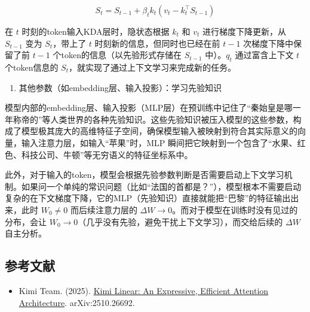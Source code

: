 \[
S_t=S_{t-1}+\beta_tk_t\left(v_t-k_t^\top S_{t-1}\right)
\]

在 \(t\) 时刻的token输入KDA层时，隐状态根据 \(k_t\) 和 \(v_t\) 进行梯度下降更新，从 \(S_{t-1}\) 变为 \(S_t\)，带上了 \(t\) 时刻新的信息，但同时也已经在前 \(t-1\) 次梯度下降中保留了前 \(t-1\) 个token的信息（以先验形式存储在 \(S_{t-1}\) 中）。\(q_t\) 通过富含上下文 \(t\) 个token信息的 \(S_t\)，就实现了通过上下文学习来完成新的任务。

\begin{enumerate}
\def\labelenumi{\arabic{enumi}.}
\setcounter{enumi}{2}
\tightlist
\item
  其他参数（如embedding层、输入投影）：学习先验知识
\end{enumerate}

模型内部的embedding层、输入投影（MLP层）在预训练中记住了``秦始皇是哪一年称帝的''等人类世界的各种先验知识。这些先验知识被压入模型的这些参数，构成了模型极其庞大的高维特征子空间，确保模型输入被映射到符合其实际意义的向量，输入注意力层，如输入``苹果''时，MLP 瞬间把它映射到一个包含了``水果、红色、科技公司、牛顿''等无穷语义的特征坐标系中。

此外，对于输入的token，模型会根据先验参数判断是否需要启动上下文学习机制。如果问一个单纯的常识问题（比如``法国的首都是？''），模型根本不需要启动复杂的在下文梯度下降，它的MLP（先验知识）直接就能把``巴黎''的特征输出出来，此时 \(W_0\ne 0\) 而后续注意力层的 \(\Delta W\to 0\)。而对于模型在训练时没有见过的分布，会让 \(W_0\to 0\)（几乎没有先验，避免干扰上下文学习），而交给后续的 \(\Delta W\) 自主分析。

\FloatBarrier
{}
\hypertarget{ux53c2ux8003ux6587ux732e-99}{%
\subsection{参考文献}\label{ux53c2ux8003ux6587ux732e-99}}

\vspace{0.25em}
\begin{itemize}
\tightlist
\item
  Kimi Team. (2025). \href{https://arxiv.org/abs/2510.26692}{Kimi Linear: An Expressive, Efficient Attention Architecture}. arXiv:2510.26692.
\end{itemize}

\clearpage
